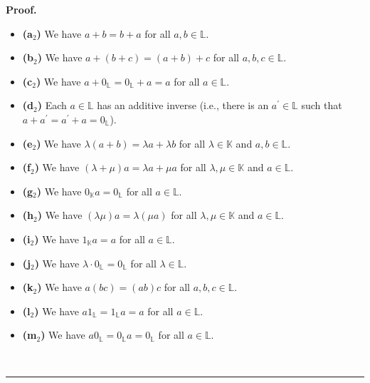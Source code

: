 \documentclass[numbers=enddot,12pt,final,onecolumn,notitlepage]{scrartcl}%
\theoremstyle{definition}
\newenvironment{fineprint}{\begin{small}}{\end{small}}
\newenvironment{proof}[1][Proof]{\noindent\textbf{#1.} }{\ \rule{0.5em}{0.5em}}
\begin{document}
\begin{fineprint}
\begin{proof}
\begin{itemize}
\item \textbf{(a}$_{2}$\textbf{)} We have $a+b=b+a$ for all $a,b\in\mathbb{L}$.

\item \textbf{(b}$_{2}$\textbf{)} We have $a+\left(  b+c\right)  =\left(
a+b\right)  +c$ for all $a,b,c\in\mathbb{L}$.

\item \textbf{(c}$_{2}$\textbf{)} We have $a+0_{\mathbb{L}}=0_{\mathbb{L}%
}+a=a$ for all $a\in\mathbb{L}$.

\item \textbf{(d}$_{2}$\textbf{)} Each $a\in\mathbb{L}$ has an additive
inverse (i.e., there is an $a^{\prime}\in\mathbb{L}$ such that $a+a^{\prime
}=a^{\prime}+a=0_{\mathbb{L}}$).

\item \textbf{(e}$_{2}$\textbf{)} We have $\lambda\left(  a+b\right)  =\lambda
a+\lambda b$ for all $\lambda\in\mathbb{K}$ and $a,b\in\mathbb{L}$.

\item \textbf{(f}$_{2}$\textbf{)} We have $\left(  \lambda+\mu\right)
a=\lambda a+\mu a$ for all $\lambda,\mu\in\mathbb{K}$ and $a\in\mathbb{L}$.

\item \textbf{(g}$_{2}$\textbf{)} We have $0_{\mathbb{K}}a=0_{\mathbb{L}}$ for
all $a\in\mathbb{L}$.

\item \textbf{(h}$_{2}$\textbf{)} We have $\left(  \lambda\mu\right)
a=\lambda\left(  \mu a\right)  $ for all $\lambda,\mu\in\mathbb{K}$ and
$a\in\mathbb{L}$.

\item \textbf{(i}$_{2}$\textbf{)} We have $1_{\mathbb{K}}a=a$ for all
$a\in\mathbb{L}$.

\item \textbf{(j}$_{2}$\textbf{)} We have $\lambda\cdot0_{\mathbb{L}%
}=0_{\mathbb{L}}$ for all $\lambda\in\mathbb{L}$.

\item \textbf{(k}$_{2}$\textbf{)} We have $a\left(  bc\right)  =\left(
ab\right)  c$ for all $a,b,c\in\mathbb{L}$.

\item \textbf{(l}$_{2}$\textbf{)} We have $a1_{\mathbb{L}}=1_{\mathbb{L}}a=a$
for all $a\in\mathbb{L}$.

\item \textbf{(m}$_{2}$\textbf{)} We have $a0_{\mathbb{L}}=0_{\mathbb{L}%
}a=0_{\mathbb{L}}$ for all $a\in\mathbb{L}$.


\end{itemize}
\end{proof}
\end{fineprint}
\end{document}
